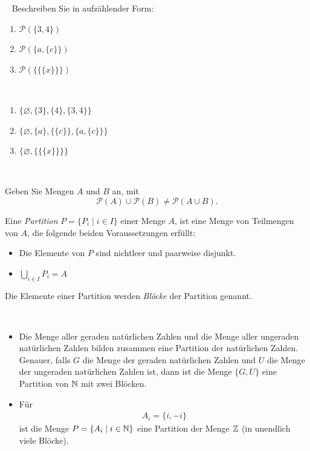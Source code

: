 \begin{ueb}~
Beschreiben Sie in aufzählender Form:
\begin{enumerate}
\item $\mathcal{P}(\{3,4\})$
\item $\mathcal{P}(\{a,\{c\}\})$
\item $\mathcal{P}(\{\{\{x\}\}\})$
\end{enumerate}
\end{ueb}
\begin{lsg}
{~
	\begin{enumerate}
	\item $ \{\varnothing, \{3\}, \{4\}, \{3, 4\}\} $
	\item $ \{\varnothing, \{a\}, \{\{c\}\}, \{a, \{c\}\}\} $
	\item $ \{\varnothing, \{\{\{x\}\}\}\} $
	\end{enumerate}
}
{~
\answerspace{4cm}
}
\end{lsg}

\begin{ueb}
Geben Sie Mengen $A$ und $B$ an, mit
\[
\mathcal{P}(A)\cup\mathcal{P}(B)\neq\mathcal{P}(A\cup B).
\]
\end{ueb}
\begin{lsg}
\end{lsg}

\begin{df}[Partitionen]\label{df:partition}
Eine \textit{Partition} $P=\{P_i\mid i\in I \}$ einer Menge $A$, ist eine Menge von Teilmengen von $A$, die folgende beiden Voraussetzungen erfüllt:
\begin{itemize}
\item Die Elemente von $P$ sind nichtleer und paarweise disjunkt.
\item $\bigcup_{i\in I}P_i=A$
\end{itemize}
Die Elemente einer Partition werden \textit{Blöcke} der Partition genannt.
\end{df}


\begin{bsp}~
\begin{itemize}
    \item Die Menge aller geraden natürlichen Zahlen und die Menge aller ungeraden natürlichen Zahlen bilden zusammen eine Partition der natürlichen Zahlen. Genauer, falls $G$ die Menge der geraden natürlichen Zahlen und $U$ die Menge der ungeraden natürlichen Zahlen ist, dann ist die Menge $\{G,U\}$ eine Partition von $\mathbb{N}$ mit zwei Blöcken.
    \item Für
    \begin{align*}
    A_i=\{i,-i\}
    \end{align*}
    ist die Menge $P=\{A_i\mid i\in\mathbb{N}\}$ eine Partition der Menge $\mathbb{Z}$ (in unendlich viele Blöcke).
\end{itemize}
\end{bsp}

